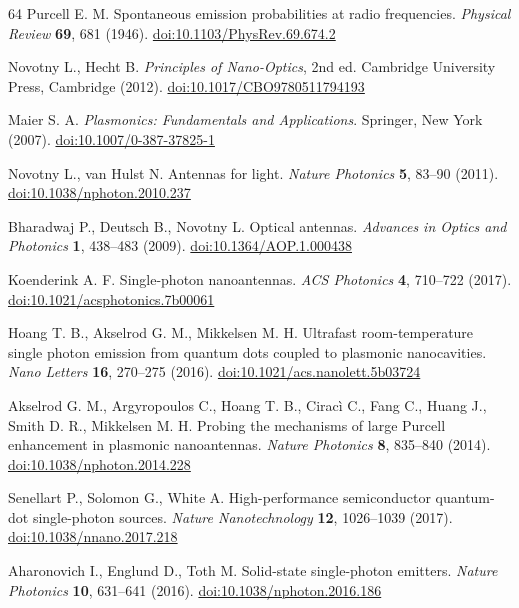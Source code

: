 \begin{thebibliography}{64}
 Purcell E. M. Spontaneous emission probabilities at radio frequencies. \textit{Physical Review} \textbf{69}, 681 (1946). \href{https://doi.org/10.1103/PhysRev.69.674.2}{doi:10.1103/PhysRev.69.674.2}

 Novotny L., Hecht B. \textit{Principles of Nano-Optics}, 2nd ed. Cambridge University Press, Cambridge (2012). \href{https://doi.org/10.1017/CBO9780511794193}{doi:10.1017/CBO9780511794193}

 Maier S. A. \textit{Plasmonics: Fundamentals and Applications}. Springer, New York (2007). \href{https://doi.org/10.1007/0-387-37825-1}{doi:10.1007/0-387-37825-1}

 Novotny L., van Hulst N. Antennas for light. \textit{Nature Photonics} \textbf{5}, 83--90 (2011). \href{https://doi.org/10.1038/nphoton.2010.237}{doi:10.1038/nphoton.2010.237}

 Bharadwaj P., Deutsch B., Novotny L. Optical antennas. \textit{Advances in Optics and Photonics} \textbf{1}, 438--483 (2009). \href{https://doi.org/10.1364/AOP.1.000438}{doi:10.1364/AOP.1.000438}

 Koenderink A. F. Single-photon nanoantennas. \textit{ACS Photonics} \textbf{4}, 710--722 (2017). \href{https://doi.org/10.1021/acsphotonics.7b00061}{doi:10.1021/acsphotonics.7b00061}

 Hoang T. B., Akselrod G. M., Mikkelsen M. H. Ultrafast room-temperature single photon emission from quantum dots coupled to plasmonic nanocavities. \textit{Nano Letters} \textbf{16}, 270--275 (2016). \href{https://doi.org/10.1021/acs.nanolett.5b03724}{doi:10.1021/acs.nanolett.5b03724}

 Akselrod G. M., Argyropoulos C., Hoang T. B., Ciracì C., Fang C., Huang J., Smith D. R., Mikkelsen M. H. Probing the mechanisms of large Purcell enhancement in plasmonic nanoantennas. \textit{Nature Photonics} \textbf{8}, 835--840 (2014). \href{https://doi.org/10.1038/nphoton.2014.228}{doi:10.1038/nphoton.2014.228}

 Senellart P., Solomon G., White A. High-performance semiconductor quantum-dot single-photon sources. \textit{Nature Nanotechnology} \textbf{12}, 1026--1039 (2017). \href{https://doi.org/10.1038/nnano.2017.218}{doi:10.1038/nnano.2017.218}

 Aharonovich I., Englund D., Toth M. Solid-state single-photon emitters. \textit{Nature Photonics} \textbf{10}, 631--641 (2016). \href{https://doi.org/10.1038/nphoton.2016.186}{doi:10.1038/nphoton.2016.186}


\end{thebibliography}
